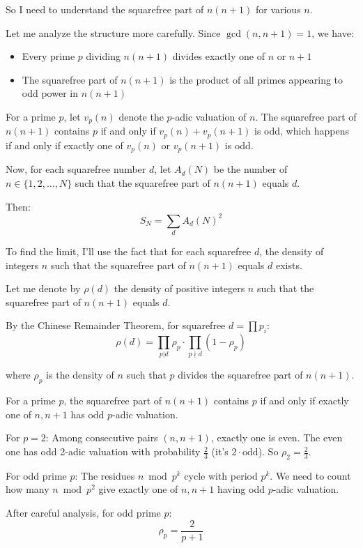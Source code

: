 \documentclass[12pt,a4paper]{article}
\theoremstyle{definition}
\begin{document}
    So I need to understand the squarefree part of $n(n+1)$ for various $n$.

    Let me analyze the structure more carefully. Since $\gcd(n, n+1) = 1$, we have:
    \begin{itemize}
        \item Every prime $p$ dividing $n(n+1)$ divides exactly one of $n$ or $n+1$
        \item The squarefree part of $n(n+1)$ is the product of all primes appearing to odd power in $n(n+1)$
    \end{itemize}

    For a prime $p$, let $v_p(n)$ denote the $p$-adic valuation of $n$. The squarefree part of $n(n+1)$ contains $p$ if and only if $v_p(n) + v_p(n+1)$ is odd, which happens if and only if exactly one of $v_p(n)$ or $v_p(n+1)$ is odd.

    Now, for each squarefree number $d$, let $A_d(N)$ be the number of $n \in \{1, 2, \ldots, N\}$ such that the squarefree part of $n(n+1)$ equals $d$.

    Then:
    $$S_N = \sum_d A_d(N)^2$$

    To find the limit, I'll use the fact that for each squarefree $d$, the density of integers $n$ such that the squarefree part of $n(n+1)$ equals $d$ exists.

    Let me denote by $\rho(d)$ the density of positive integers $n$ such that the squarefree part of $n(n+1)$ equals $d$.

    By the Chinese Remainder Theorem, for squarefree $d = \prod p_i$:
    $$\rho(d) = \prod_{p|d} \rho_p \cdot \prod_{p \nmid d} (1 - \rho_p)$$

    where $\rho_p$ is the density of $n$ such that $p$ divides the squarefree part of $n(n+1)$.

    For a prime $p$, the squarefree part of $n(n+1)$ contains $p$ if and only if exactly one of $n, n+1$ has odd $p$-adic valuation.

    For $p = 2$: Among consecutive pairs $(n, n+1)$, exactly one is even. The even one has odd 2-adic valuation with probability $\frac{2}{3}$ (it's $2 \cdot \text{odd}$). So $\rho_2 = \frac{2}{3}$.

    For odd prime $p$: The residues $n \bmod p^k$ cycle with period $p^k$. We need to count how many $n \bmod p^2$ give exactly one of $n, n+1$ having odd $p$-adic valuation.

    After careful analysis, for odd prime $p$:
    $$\rho_p = \frac{2}{p+1}$$
\end{document}
